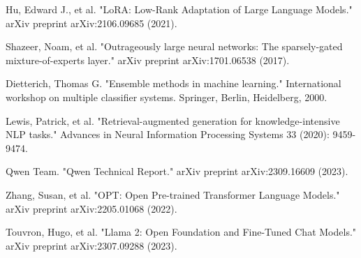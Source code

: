 \documentclass[10pt,twocolumn,letterpaper]{article}
\begin{document}
\begin{thebibliography}{9}
 Hu, Edward J., et al. "LoRA: Low-Rank Adaptation of Large Language Models." arXiv preprint arXiv:2106.09685 (2021).

 Shazeer, Noam, et al. "Outrageously large neural networks: The sparsely-gated mixture-of-experts layer." arXiv preprint arXiv:1701.06538 (2017).

 Dietterich, Thomas G. "Ensemble methods in machine learning." International workshop on multiple classifier systems. Springer, Berlin, Heidelberg, 2000.

 Lewis, Patrick, et al. "Retrieval-augmented generation for knowledge-intensive NLP tasks." Advances in Neural Information Processing Systems 33 (2020): 9459-9474.

 Qwen Team. "Qwen Technical Report." arXiv preprint arXiv:2309.16609 (2023).

 Zhang, Susan, et al. "OPT: Open Pre-trained Transformer Language Models." arXiv preprint arXiv:2205.01068 (2022).

 Touvron, Hugo, et al. "Llama 2: Open Foundation and Fine-Tuned Chat Models." arXiv preprint arXiv:2307.09288 (2023).
\end{thebibliography}
\end{document}
